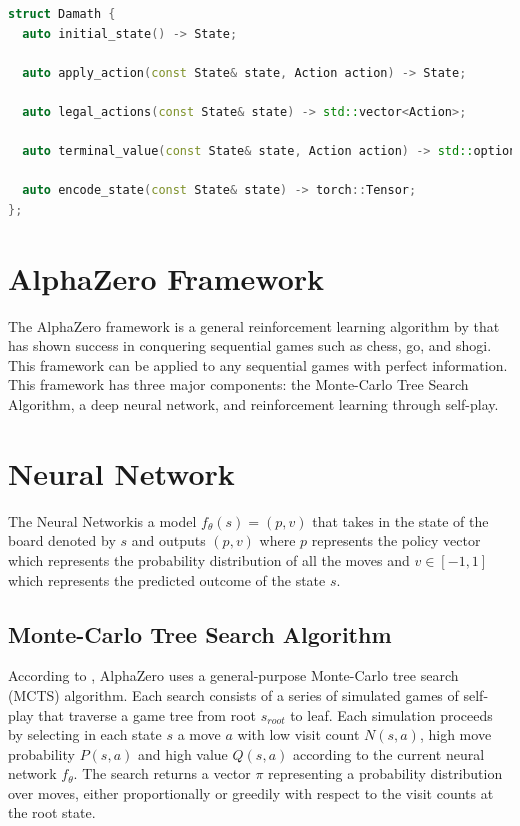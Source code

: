 \begin{lstlisting}[language=C++,captionpos=b,label={lst:game_interface},caption={Game Interface of Damath}]
struct Damath {
  auto initial_state() -> State;

  auto apply_action(const State& state, Action action) -> State;

  auto legal_actions(const State& state) -> std::vector<Action>;

  auto terminal_value(const State& state, Action action) -> std::optional<double>;

  auto encode_state(const State& state) -> torch::Tensor;
};
\end{lstlisting}


\section{AlphaZero Framework}
The AlphaZero framework is a general reinforcement learning algorithm by \cite{silver2017masteringchessshogiselfplay} that has shown success in conquering sequential games such as chess, go, and shogi. This framework can be applied to any sequential games with perfect information. This framework has three major components: the Monte-Carlo Tree Search Algorithm, a deep neural network, and reinforcement learning through self-play.

\section{Neural Network}

The Neural Networkis a model $f_\theta(s) = (p,v)$ that takes in the state of the board denoted by $s$ and outputs $(p,v)$ where $p$ represents the policy vector which represents the probability distribution of all the moves and $v \in [-1, 1]$ which represents the predicted outcome of the state $s$.


\subsection{Monte-Carlo Tree Search Algorithm}


According to \cite{silver2017masteringchessshogiselfplay}, AlphaZero uses a general-purpose Monte-Carlo tree search (MCTS) algorithm. Each search consists of a series of simulated games of self-play that traverse a game tree from root $s_{root}$ to leaf. Each simulation proceeds by selecting in each state $s$ a move $a$ with low visit count $N(s, a)$, high move probability $P(s,a)$ and high value $Q(s, a)$ according to the current neural network $f_\theta$. The search returns a vector $\pi$ representing a probability distribution over moves, either proportionally or greedily with respect to the visit counts at the root state.

